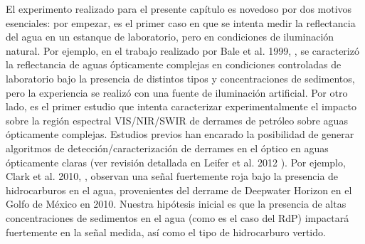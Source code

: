     El experimento realizado para el presente capítulo es novedoso por dos motivos esenciales: por empezar, es el primer caso en que se intenta medir la reflectancia del agua en un estanque de laboratorio, pero en condiciones de iluminación natural. Por ejemplo, en el trabajo realizado por Bale et al. 1999, \cite{bale1994}, se caracterizó la reflectancia de aguas ópticamente complejas en condiciones controladas de laboratorio bajo la presencia de distintos tipos y concentraciones de sedimentos, pero la experiencia se realizó con una fuente de iluminación artificial.
    Por otro lado, es el primer estudio que intenta caracterizar experimentalmente el impacto sobre la región espectral VIS/NIR/SWIR de derrames de petróleo sobre aguas ópticamente complejas. Estudios previos han encarado la posibilidad de generar algoritmos de detección/caracterización de derrames en el óptico en aguas ópticamente claras (ver revisión detallada en Leifer et al. 2012 \cite{leifer2012}). Por ejemplo, Clark et al. 2010, \cite{clark2010}, observan una señal fuertemente roja bajo la presencia de hidrocarburos en el agua, provenientes del derrame de Deepwater Horizon en el Golfo de México en 2010. Nuestra hipótesis inicial es que la presencia de altas concentraciones de sedimentos en el agua (como es el caso del RdP) impactará fuertemente en la señal medida, así como el tipo de hidrocarburo vertido.
    

